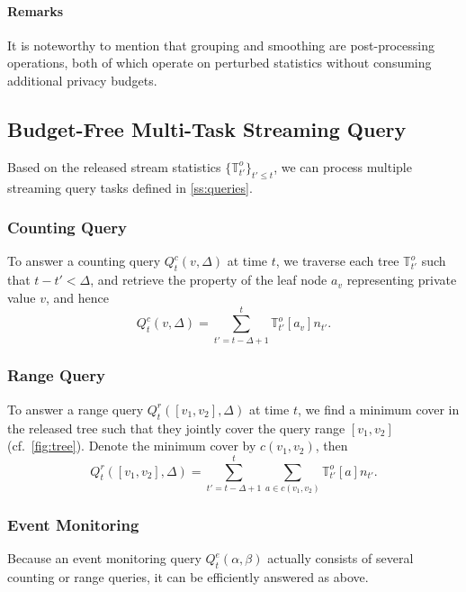 \documentclass[acmsmall]{acmart}
\newcommand{\Tree}{\mathbb{T}}
\newcommand{\OT}{\Tree^o}
\begin{document}
\paragraph{Remarks}
It is noteworthy to mention that grouping and smoothing are post-processing
operations, both of which operate on perturbed statistics without consuming
additional privacy budgets.





\subsection{Budget-Free Multi-Task Streaming Query}

Based on the released stream statistics $\{\OT_{t'}\}_{t'\leq t}$, we can process
multiple streaming query tasks defined in \cref{ss:queries}.

\subsubsection{Counting Query}

To answer a counting query $Q_t^c(v,\Delta)$ at time $t$, we traverse each tree
$\OT_{t'}$ such that $t - t' < \Delta$, and retrieve the property of the leaf
node $a_v$ representing private value $v$, and hence
\[
  Q_t^c(v,\Delta) = \sum_{t'=t-\Delta+1}^t \OT_{t'}[a_v]n_{t'}.
\]

\subsubsection{Range Query}

To answer a range query $Q_t^r([v_1,v_2], \Delta)$ at time $t$, we find a
minimum cover in the released tree such that they jointly cover the query range
$[v_1,v_2]$ (cf.~\cref{fig:tree}).
Denote the minimum cover by $c(v_1,v_2)$, then
\[
  Q_t^r([v_1, v_2], \Delta) =
  \sum_{t'=t-\Delta+1}^t\sum_{a\in c(v_1,v_2)} \OT_{t'}[a]n_{t'}.
\]

\subsubsection{Event Monitoring}

Because an event monitoring query $Q_t^e(\alpha,\beta)$ actually consists of
several counting or range queries, it can be efficiently
answered as above.
\end{document}
